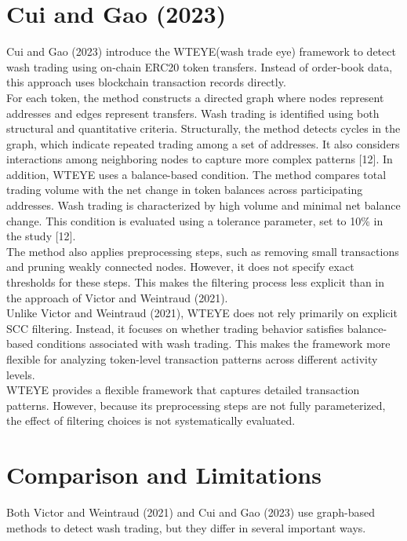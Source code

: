 \documentclass[language=english,thesis=bachelor,nosecondtitle,faculty=cb,onesided,12pt]{hsmw-thesis}
\begin{document}
	\section{Cui and Gao (2023)}
Cui and Gao (2023) introduce the WTEYE(wash trade eye) framework to detect wash trading using on-chain ERC20 token transfers. Instead of order-book data, this approach uses blockchain transaction records directly.\\
For each token, the method constructs a directed graph where nodes represent addresses and edges represent transfers. Wash trading is identified using both structural and quantitative criteria. Structurally, the method detects cycles in the graph, which indicate repeated trading among a set of addresses. It also considers interactions among neighboring nodes to capture more complex patterns [12].
In addition, WTEYE uses a balance-based condition. The method compares total trading volume with the net change in token balances across participating addresses. Wash trading is characterized by high volume and minimal net balance change. This condition is evaluated using a tolerance parameter, set to 10\% in the study [12].\\
The method also applies preprocessing steps, such as removing small transactions and pruning weakly connected nodes. However, it does not specify exact thresholds for these steps. This makes the filtering process less explicit than in the approach of Victor and Weintraud (2021).\\
Unlike Victor and Weintraud (2021), WTEYE does not rely primarily on explicit SCC filtering. Instead, it focuses on whether trading behavior satisfies balance-based conditions associated with wash trading. This makes the framework more flexible for analyzing token-level transaction patterns across different activity levels.\\
WTEYE provides a flexible framework that captures detailed transaction patterns. However, because its preprocessing steps are not fully parameterized, the effect of filtering choices is not systematically evaluated.

	\section{Comparison and Limitations}
Both Victor and Weintraud (2021) and Cui and Gao (2023) use graph-based methods to detect wash trading, but they differ in several important ways.
\end{document}
